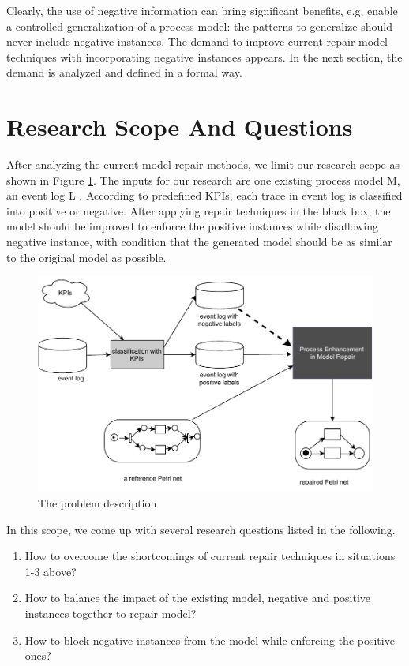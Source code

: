 Clearly, the use of negative information can bring significant benefits, e.g, enable a controlled generalization of a process model: the patterns to generalize should never include negative instances. The demand to improve current repair model techniques with incorporating negative instances appears. In the next section, the demand is analyzed and defined in a formal way.

\section{Research Scope And Questions }
After analyzing the current model repair methods, we limit our research scope as shown in Figure \ref{fig:scope}.  The inputs for our research are one existing process model M, an event log L . According to predefined KPIs, each trace in event log is classified into positive or negative. After applying repair techniques in the black box, the model should be improved to enforce the positive instances while disallowing negative instance, with condition that the generated model should be as similar to the original model as possible. 
\begin{figure}
	\centering
	\includegraphics[width=\textwidth]{figures/introduction/P06-problem-scope.pdf}
	\caption{The problem description}
	\label{fig:scope}
\end{figure}

In this scope, we come up with several research questions listed in the following.
\begin{enumerate}[start=1,label={\bfseries{ RQ\arabic*:}}]
	\item How to overcome the shortcomings of current repair techniques in situations 1-3 above?
	\item How to balance the impact of the existing model, negative and positive instances together to repair model? 
	\item How to block negative instances from the model while enforcing the positive ones?
\end{enumerate}
  
